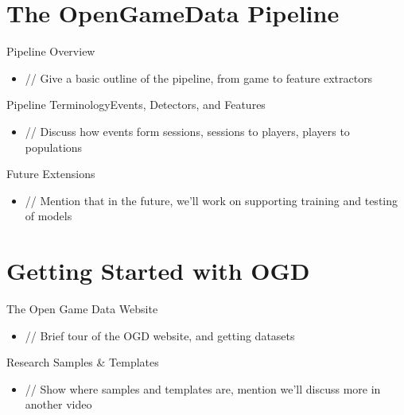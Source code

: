 \documentclass{beamer}
\begin{document}
\section[OGD Pipeline]{The OpenGameData Pipeline}

\begin{frame}{Pipeline Overview}
  \begin{itemize}
  \item
    // Give a basic outline of the pipeline, from game to feature extractors
    \pause
  \end{itemize}
\end{frame}

\begin{frame}{Pipeline Terminology}{Events, Detectors, and Features}
  \begin{itemize}
  \item
    // Discuss how events form sessions, sessions to players, players to populations
    \pause
  \end{itemize}
\end{frame}

\begin{frame}{Future Extensions}
  \begin{itemize}
  \item
    // Mention that in the future, we'll work on supporting training and testing of models
    \pause
  \end{itemize}
\end{frame}

\section[Getting Started]{Getting Started with OGD}

\begin{frame}{The Open Game Data Website}
  \begin{itemize}
  \item
    // Brief tour of the OGD website, and getting datasets
    \pause
  \end{itemize}
\end{frame}

\begin{frame}{Research Samples \& Templates}
  \begin{itemize}
  \item
    // Show where samples and templates are, mention we'll discuss more in another video
    \pause
  \end{itemize}
\end{frame}
\end{document}
